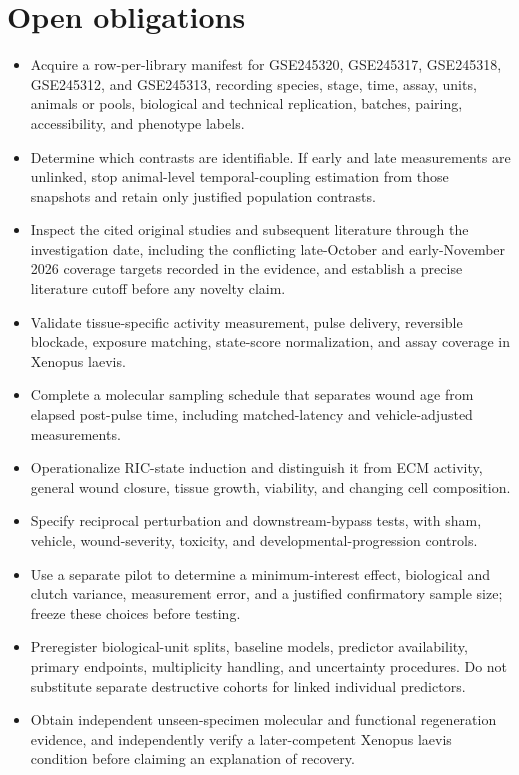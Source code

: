 \documentclass[11pt]{article}
\begin{document}
\section{Open obligations}
\begin{itemize}
\item Acquire a row-per-library manifest for GSE245320, GSE245317, GSE245318, GSE245312, and GSE245313, recording species, stage, time, assay, units, animals or pools, biological and technical replication, batches, pairing, accessibility, and phenotype labels.
\item Determine which contrasts are identifiable. If early and late measurements are unlinked, stop animal-level temporal-coupling estimation from those snapshots and retain only justified population contrasts.
\item Inspect the cited original studies and subsequent literature through the investigation date, including the conflicting late-October and early-November 2026 coverage targets recorded in the evidence, and establish a precise literature cutoff before any novelty claim.
\item Validate tissue-specific activity measurement, pulse delivery, reversible blockade, exposure matching, state-score normalization, and assay coverage in Xenopus laevis.
\item Complete a molecular sampling schedule that separates wound age from elapsed post-pulse time, including matched-latency and vehicle-adjusted measurements.
\item Operationalize RIC-state induction and distinguish it from ECM activity, general wound closure, tissue growth, viability, and changing cell composition.
\item Specify reciprocal perturbation and downstream-bypass tests, with sham, vehicle, wound-severity, toxicity, and developmental-progression controls.
\item Use a separate pilot to determine a minimum-interest effect, biological and clutch variance, measurement error, and a justified confirmatory sample size; freeze these choices before testing.
\item Preregister biological-unit splits, baseline models, predictor availability, primary endpoints, multiplicity handling, and uncertainty procedures. Do not substitute separate destructive cohorts for linked individual predictors.
\item Obtain independent unseen-specimen molecular and functional regeneration evidence, and independently verify a later-competent Xenopus laevis condition before claiming an explanation of recovery.
\end{itemize}
\end{document}
